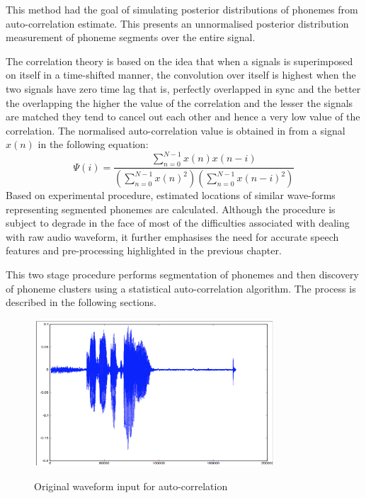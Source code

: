This method had the goal of simulating posterior distributions of phonemes from auto-correlation estimate.  This presents an unnormalised posterior distribution measurement of phoneme segments over the entire signal.

The correlation theory is based on the idea that when a signals is superimposed on itself in a time-shifted manner, the convolution over itself is highest when the two signals have zero time lag that is, perfectly overlapped in sync and the better the overlapping the higher the value of the correlation and the lesser the signals are matched they tend to cancel out each other and hence a very low value of the correlation.  The normalised auto-correlation value is obtained in \cite{picone1996fundamentals} from a signal $x(n)$ in the following equation:
\begin{equation}
    \Psi(i)=\frac{\sum_{n=0}^{N-1}x(n)x(n-i)}{\left(\sum_{n=0}^{N-1}x(n)^2\right)\left(\sum_{n=0}^{N-1}x(n-i)^2\right)}\label{c3eq_corr}
\end{equation}
Based on experimental procedure, estimated locations of similar wave-forms representing segmented phonemes are calculated.  Although the procedure is subject to degrade in the face of most of the difficulties associated with dealing with raw audio waveform, it further emphasises the need for accurate speech features and pre-processing highlighted in the previous chapter.

This two stage procedure performs segmentation of phonemes and then discovery of phoneme clusters using a statistical auto-correlation algorithm.  The process is described in the following sections.
\begin{figure}
\centering
  \includegraphics[width=9cm]{thesis/images/corr}\\
  \caption{Original waveform input for auto-correlation}\label{fig_c3_exp01}
\end{figure}

